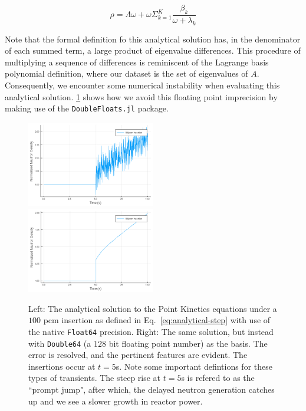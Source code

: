 \documentclass[review,onefignum,onetabnum]{siamart171218}
\begin{document}
\begin{equation}
  \rho = \Lambda\omega + \omega \Sigma_{k=1}^K \frac{\beta_k}{\omega + \lambda_k}
\end{equation}

Note that the formal definition fo this analytical solution has, in the denominator
of each summed term, a large product of eigenvalue differences. This procedure of
multiplying a sequence of differences is reminiscent of the Lagrange basis polynomial
definition, where our dataset is the set of eigenvalues of $A$. Consequently,
we encounter some numerical instability when evaluating this analytical solution.
\cref{fig:single-double-prec} shows how we avoid this floating point
imprecision by making use of the \texttt{DoubleFloats.jl} package.\\
\begin{figure}[htb]
  \includegraphics[width=0.5\textwidth]{../plots/analytical-sols/100pcm_fp_error.png}
  \includegraphics[width=0.5\textwidth]{../plots/analytical-sols/100pcm.png}
  \caption{Left: The analytical solution to the Point Kinetics equations under a $100$ pcm insertion
  as defined in Eq.~\cref{eq:analytical-step} with use of the native \texttt{Float64} precision.
  Right: The same solution, but instead with \texttt{Double64} (a $128$ bit floating point number)
  as the basis. The error is resolved, and the pertinent features are evident. The insertions occur
  at $t = 5$s. Note some important defintions for these types of transients. The steep rise
  at $t = 5$s is refered to as the ``prompt jump", after which, the delayed neutron generation
  catches up and we see a slower growth in reactor power.}
  \label{fig:single-double-prec}
\end{figure}
\end{document}
